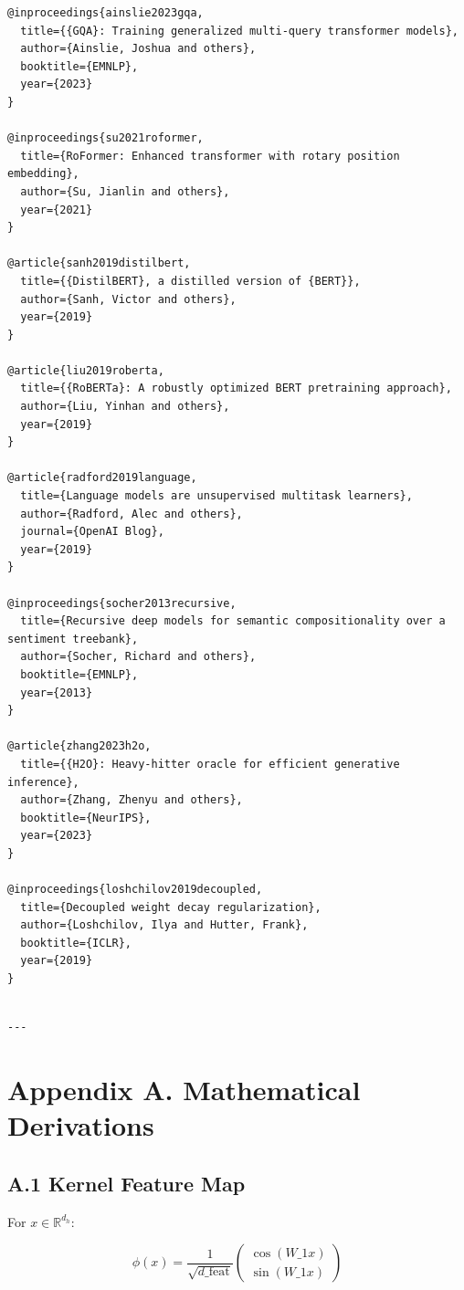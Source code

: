 \begin{lstlisting}
@inproceedings{ainslie2023gqa,
  title={{GQA}: Training generalized multi-query transformer models},
  author={Ainslie, Joshua and others},
  booktitle={EMNLP},
  year={2023}
}

@inproceedings{su2021roformer,
  title={RoFormer: Enhanced transformer with rotary position embedding},
  author={Su, Jianlin and others},
  year={2021}
}

@article{sanh2019distilbert,
  title={{DistilBERT}, a distilled version of {BERT}},
  author={Sanh, Victor and others},
  year={2019}
}

@article{liu2019roberta,
  title={{RoBERTa}: A robustly optimized BERT pretraining approach},
  author={Liu, Yinhan and others},
  year={2019}
}

@article{radford2019language,
  title={Language models are unsupervised multitask learners},
  author={Radford, Alec and others},
  journal={OpenAI Blog},
  year={2019}
}

@inproceedings{socher2013recursive,
  title={Recursive deep models for semantic compositionality over a sentiment treebank},
  author={Socher, Richard and others},
  booktitle={EMNLP},
  year={2013}
}

@article{zhang2023h2o,
  title={{H2O}: Heavy-hitter oracle for efficient generative inference},
  author={Zhang, Zhenyu and others},
  booktitle={NeurIPS},
  year={2023}
}

@inproceedings{loshchilov2019decoupled,
  title={Decoupled weight decay regularization},
  author={Loshchilov, Ilya and Hutter, Frank},
  booktitle={ICLR},
  year={2019}
}
\end{lstlisting}
\begin{lstlisting}

---
\end{lstlisting}

\section{Appendix A. Mathematical Derivations}

\subsection{A.1 Kernel Feature Map}

For $x \in \mathbb{R}^{d_h}$:

\[
\phi(x) = \frac{1}{\sqrt{d\_\text{feat}}} \begin{pmatrix} \cos(W\_1 x) \\ \sin(W\_1 x) \end{pmatrix}
\tag{A.1}
\]

